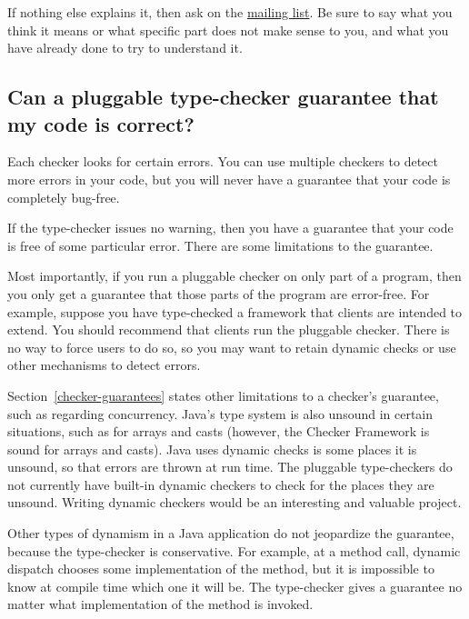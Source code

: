 If nothing else explains it, then ask on the
\href{https://groups.google.com/forum/#!forum/checker-framework-discuss}{mailing
  list}.  Be sure to say what you think it means or what specific part does
not make sense to you, and what you have already done to try to understand it.


\subsection{Can a pluggable type-checker guarantee that my code is correct?\label{faq-no-absolute-guarantee}}

Each checker looks for certain errors.  You can use multiple checkers to
detect more errors in your code, but you will never have a guarantee that
your code is completely bug-free.

If the type-checker issues no warning, then you have a guarantee that your
code is free of some particular error.  There are some limitations to the
guarantee.

Most importantly, if you run a pluggable checker on only part of a program, then
you only get a guarantee that those parts of the program are error-free.
For example, suppose you have type-checked a framework that clients
are intended to extend.  You should recommend that clients
run the pluggable checker.  There is no way to force users to do so, so you
may want to retain dynamic checks or use other mechanisms to detect errors.

Section~\ref{checker-guarantees} states other limitations to a checker's
guarantee, such as regarding concurrency.  Java's type system is also
unsound in certain situations, such as for arrays and casts (however, the
Checker Framework is sound for arrays and casts).  Java uses dynamic checks
is some places it is unsound, so that errors are thrown at run time.  The
pluggable type-checkers do not currently have built-in dynamic checkers to
check for the places they are unsound.
Writing dynamic checkers would be an interesting and valuable project.

Other types of dynamism in a Java application do not jeopardize the
guarantee, because the type-checker is conservative.  For example, at a
method call, dynamic dispatch chooses some implementation of the method,
but it is impossible to know at compile time which one it will be.  The
type-checker gives a guarantee no matter what implementation of the method
is invoked.


